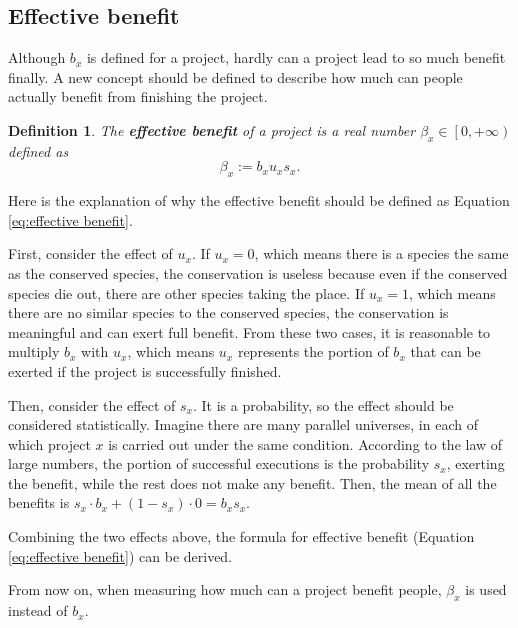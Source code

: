 \documentclass{article}
\newtheorem{definition}{Definition}
\begin{document}

\subsection{Effective benefit}
\label{sec:effective benefit}

Although $b_x$ is defined for a project, hardly can a project lead to so much benefit finally.
A new concept should be defined to describe how much can people actually benefit from finishing the project.

\begin{definition}
The \textbf{effective benefit} of a project is a real number $\beta_x\in\left[0,+\infty\right)$ defined as
\begin{equation}
\label{eq:effective benefit}
\beta_x:=b_xu_xs_x.
\end{equation}
\end{definition}

Here is the explanation of why the effective benefit should be defined as Equation \ref{eq:effective benefit}.

First, consider the effect of $u_x$.
If $u_x=0$, which means there is a species the same as the conserved species,
the conservation is useless because even if the conserved species die out, there are other species taking the place.
If $u_x=1$, which means there are no similar species to the conserved species,
the conservation is meaningful and can exert full benefit.
From these two cases, it is reasonable to multiply $b_x$ with $u_x$,
which means $u_x$ represents the portion of $b_x$ that can be exerted if the project is successfully finished.

Then, consider the effect of $s_x$.
It is a probability, so the effect should be considered statistically.
Imagine there are many parallel universes, in each of which project $x$ is carried out under the same condition.
According to the law of large numbers, the portion of successful executions is the probability $s_x$, exerting the benefit,
while the rest does not make any benefit.
Then, the mean of all the benefits is $s_x\cdot b_x+\left(1-s_x\right)\cdot0=b_xs_x$.

Combining the two effects above, the formula for effective benefit (Equation \ref{eq:effective benefit}) can be derived.

From now on, when measuring how much can a project benefit people,
$\beta_x$ is used instead of $b_x$.


\end{document}
